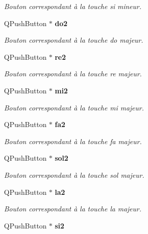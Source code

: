 \begin{DoxyCompactItemize}
\begin{DoxyCompactList}\small\item\em Bouton correspondant à la touche si mineur. \end{DoxyCompactList}\item 
Q\-Push\-Button $\ast$ {\bf do2}\label{class_clavier_piano_a0a1bce64ae5a8e1dab0e0309fafd512e}

\begin{DoxyCompactList}\small\item\em Bouton correspondant à la touche do majeur. \end{DoxyCompactList}\item 
Q\-Push\-Button $\ast$ {\bf re2}\label{class_clavier_piano_a61911af8bb727be3b741a8d1fdb1161b}

\begin{DoxyCompactList}\small\item\em Bouton correspondant à la touche re majeur. \end{DoxyCompactList}\item 
Q\-Push\-Button $\ast$ {\bf mi2}\label{class_clavier_piano_a63a512a6cff0119046a8849fe5425365}

\begin{DoxyCompactList}\small\item\em Bouton correspondant à la touche mi majeur. \end{DoxyCompactList}\item 
Q\-Push\-Button $\ast$ {\bf fa2}\label{class_clavier_piano_a36b892e46a6352c88bab1c99edcb11d6}

\begin{DoxyCompactList}\small\item\em Bouton correspondant à la touche fa majeur. \end{DoxyCompactList}\item 
Q\-Push\-Button $\ast$ {\bf sol2}\label{class_clavier_piano_aefd89eb93313470d66889cba9a841705}

\begin{DoxyCompactList}\small\item\em Bouton correspondant à la touche sol majeur. \end{DoxyCompactList}\item 
Q\-Push\-Button $\ast$ {\bf la2}\label{class_clavier_piano_afabd9ae6819fb093f5af88d10823fedb}

\begin{DoxyCompactList}\small\item\em Bouton correspondant à la touche la majeur. \end{DoxyCompactList}\item 
Q\-Push\-Button $\ast$ {\bf si2}\label{class_clavier_piano_a5a842c49661217f8a1101dead2ba1246}


\end{DoxyCompactItemize}
